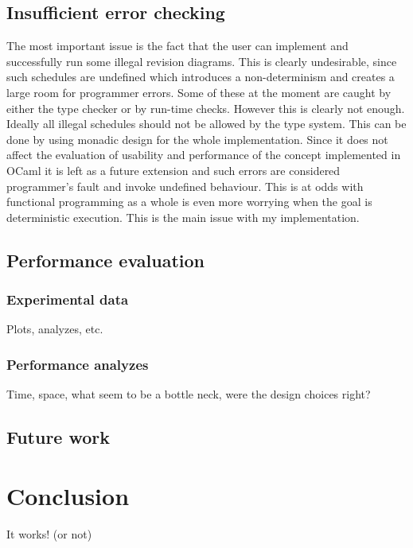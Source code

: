 \documentclass[12pt,twoside,notitlepage]{report}
\begin{document}
\section{Insufficient error checking}
\label{problems}
The most important issue is the fact that the user can implement and successfully run some illegal revision diagrams. This is clearly undesirable, since such schedules are undefined which introduces a non-determinism and creates a large room for programmer errors. Some of these at the moment are caught by either the type checker or by run-time checks. However this is clearly not enough. Ideally all illegal schedules should not be allowed by the type system. This can be done by using monadic design for the whole implementation. Since it does not affect the evaluation of usability and performance of the concept implemented in OCaml it is left as a future extension and such errors are considered programmer's fault and invoke undefined behaviour. This is at odds with functional programming as a whole is even more worrying when the goal is deterministic execution. This is the main issue with my implementation.


\section{Performance evaluation}
\subsection{Experimental data}
Plots, analyzes, etc.

\subsection{Performance analyzes}
Time, space, what seem to be a bottle neck, were the design choices right? 

\section{Future work}


\cleardoublepage
\chapter{Conclusion}

It works! (or not)




\cleardoublepage

\end{document}

